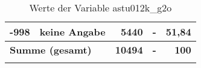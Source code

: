 \begin{longtable}{Xlrrr}
       -998 & keine Angabe & 5440 & - & 51,84 \\

     \midrule
     \multicolumn{2}{l}{\textbf{Summe (gesamt)}} & \textbf{10494} & \textbf{-} & \textbf{100} \\
     \bottomrule
     \caption{Werte der Variable astu012k\_g2o}
     \end{longtable}
     
